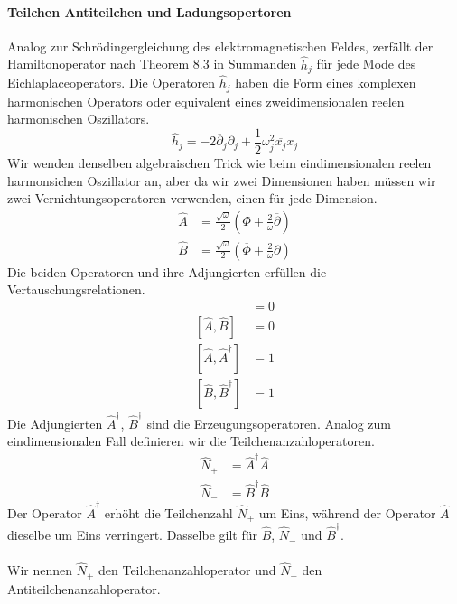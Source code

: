 \documentclass[11pt,a4paper,leqno]{report}
\numberwithin{equation}{chapter}
\begin{document}
\paragraph{Teilchen Antiteilchen und Ladungsopertoren} Analog zur Schr\"odingergleichung des elektromagnetischen Feldes, zerf\"allt der Hamiltonoperator nach Theorem 8.3 in Summanden $\hat{h}_j$ f\"ur jede Mode des Eichlaplaceoperators. Die Operatoren  $\hat{h}_j$ haben die Form eines komplexen harmonischen Operators oder equivalent eines zweidimensionalen reelen harmonischen Oszillators.
\begin{equation}
	\hat{h}_j= -2\overline{\partial}_j\partial_j + \frac{1}{2}\omega_j^2 \overline{x_j}x_j
\end{equation}	
Wir wenden denselben algebraischen Trick wie beim eindimensionalen reelen harmonsichen Oszillator an, aber da wir zwei Dimensionen haben m\"ussen wir zwei Vernichtungsoperatoren verwenden, einen f\"ur jede Dimension.\\
\begin{align}
	\hat{A} &= \frac{\sqrt{\omega}}{2}(\Phi + \frac{2}{\omega}\overline{\partial})\\
	\hat{B} &= \frac{\sqrt{\omega}}{2}(\overline{\Phi} + \frac{2}{\omega}\partial)
\end{align}
Die beiden Operatoren und ihre Adjungierten erf\"ullen die Vertauschungsrelationen.
\begin{align*}
	[\hat{A}, \hat{B}^\dagger] &= 0\\
	[\hat{A}, \hat{B}] &= 0\\
	[\hat{A}, \hat{A}^\dagger] &= 1\\
	[\hat{B}, \hat{B}^\dagger] &= 1
\end{align*}
Die Adjungierten $\hat{A}^\dagger$, $\hat{B}^\dagger$ sind die Erzeugungsoperatoren. Analog zum eindimensionalen Fall definieren wir die Teilchenanzahloperatoren.
\begin{align*}
	\hat{N}_+ &= \hat{A}^\dagger \hat{A}\\
	\hat{N}_- &= \hat{B}^\dagger \hat{B}
\end{align*}
Der Operator $\hat{A}^\dagger$ erh\"oht die Teilchenzahl $\hat{N}_+$ um Eins, während der Operator $\hat{A}$ dieselbe um Eins verringert. Dasselbe gilt f\"ur $\hat{B}$, $\hat{N}_-$ und $\hat{B}^\dagger$.\\
\\
Wir nennen $\hat{N}_+$ den Teilchenanzahloperator und $\hat{N}_-$ den Antiteilchenanzahloperator.\\
\\
\end{document}
